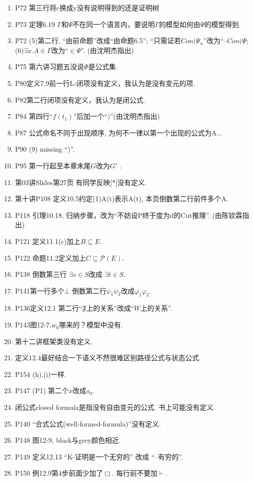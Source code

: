 \documentclass{article}
\begin{document}
\begin{enumerate}
\item P72 第三行将c换成y没有说明得到的还是证明树
\item P73 定理6.19 $\Gamma$和$\Psi$不在同一个语言内，要说明$\Gamma$的模型如何由$\Psi$的模型得到. 
\item P72 (5)第二行, ``由前命题''改成``由命题6.5''; ``只需证若$Con(\Psi_n$''改为``--$Con(\Psi$; (6)$\exists x.A \in \Gamma$改为``$\in \Psi$''. (由沈明杰指出)
\item P75 第六讲习题五没说$\Phi$是公式集. 
\item P80定义7.9前一行L-闭项没有定义，我认为是没有变元的项. 
\item P82第二行闭项没有定义，我认为是闭公式. 
\item P84 第四行``$f(t_1)$''后加一个``)''(由沈明杰指出)
\item P87 公式命名不同于出现顺序, 为何不一律以第一个出现的公式为A...
\item P90 (9) missing ``)''. 
\item P95 第一行起至本章末尾$G$改为$G'$ . 
\item 第03讲Slides第27页 有同学反映[*]没有定义. 
\item 第十讲P108 定义10.5约定(1)A(t)表示A(t), 本页倒数第二行前件多个A. 
\item P118 引理10.18, 归纳步骤，改为``不妨设P终于度为d的Cut推理''. (由陈钦霖指出)
\item P121 定义11.1(c)加上$B\subseteq E$. 
\item P122 命题11.2定义加上$C\subseteq \mathcal{P}(E)$. 
\item P138 倒数第三行 $\exists s \in S$改成 $\exists t \in S$. 
\item P141第一行多个$\bot$ 倒数第二行$\psi_1 \psi_2$改成$\varphi_1 \varphi_2$. 
\item P136定义12.1 第二行``$\mathfrak{F}$上的关系''改成``$W$上的关系''. 
\item P143图12-7,$w_6$哪来的？模型中没有. 
\item 第十二讲框架类没有定义. 


\item 定义12.4最好结合一下语义不然很难区别路径公式与状态公式. 
\item P154 (h),(i)一样. 
\item P147 (P1) 第二个$x$改成$s_0$. 
\item 闭公式closed formula是指没有自由变元的公式. 书上可能没有定义. 
\item P140 ``合式公式(well-formed-formula)''没有定义. 
\item P148 图12-9, black与grey颜色相近. 
\item P149 定义12.13 ``K-证明是一个无穷的'' 改成 ``--有穷的''. 
\item P150 例12.9第4步前面少加了$\Box$. 每行前不要加$\vdash$. 


\end{enumerate}
\end{document}
